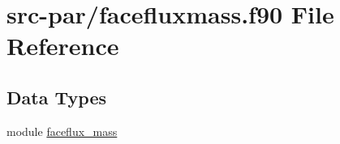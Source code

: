\hypertarget{facefluxmass_8f90}{\section{src-\/par/facefluxmass.f90 File Reference}
\label{facefluxmass_8f90}
}
\subsection*{Data Types}
\begin{DoxyCompactItemize}
\item 
module \hyperlink{classfaceflux__mass}{faceflux\-\_\-mass}
\end{DoxyCompactItemize}
